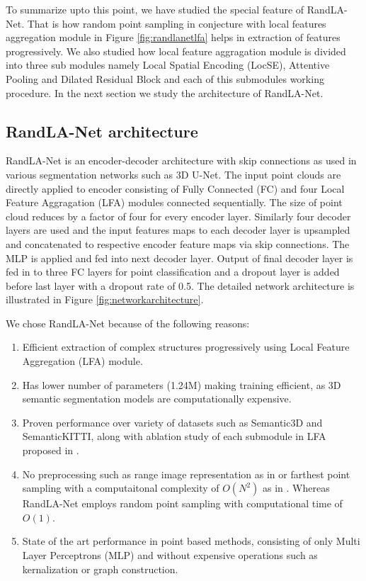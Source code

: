 To summarize upto this point, we have studied the special feature of RandLA-Net. That is how random point sampling in conjecture with local features aggregation module in Figure \ref{fig:randlanetlfa} helps in extraction of features progressively.
We also studied how local feature aggragation module is divided into three sub modules namely Local Spatial Encoding (LocSE), Attentive Pooling and Dilated Residual Block and each of this submodules working procedure.
In the next section we study the architecture of RandLA-Net.

\subsection{RandLA-Net architecture}
RandLA-Net is an encoder-decoder architecture with skip connections as used in various segmentation networks such as 3D U-Net\cite{wang2018two_3DUnet}.
The input point clouds are directly applied to encoder consisting of Fully Connected (FC) and four Local Feature Aggragation (LFA) modules connected sequentially.
The size of point cloud reduces by a factor of four for every encoder layer. 
Similarly four decoder layers are used and the input features maps to each decoder layer is upsampled and concatenated to respective encoder feature maps via skip connections.
The MLP is applied and fed into next decoder layer.
Output of final decoder layer is fed in to three FC layers for point classification and a dropout layer is added before last layer with a dropout rate of 0.5.
The detailed network architecture is illustrated in Figure \ref{fig:networkarchitecture}.


We chose RandLA-Net because of the following reasons:
\begin{enumerate}
    \item Efficient extraction of complex structures progressively using Local Feature Aggregation (LFA) module.
    \item Has lower number of parameters (1.24M) making training efficient, as 3D semantic segmentation models are computationally expensive.
    \item Proven performance over variety of datasets such as Semantic3D and SemanticKITTI, along with ablation study of each submodule in LFA proposed in \cite{Hu_2020_CVPR_Randla}.
    \item No preprocessing such as range image representation as in \cite{Milioto2019} or farthest point sampling with a computaitonal complexity of $O(N^2)$ as in \cite{Qi_2017_CVPR_pointnet}. Whereas RandLA-Net employs random point sampling with computational time of $O(1)$.
    \item State of the art performance in point based methods, consisting of only Multi Layer Perceptrons (MLP) and without expensive operations such as kernalization or graph construction.
\end{enumerate}

